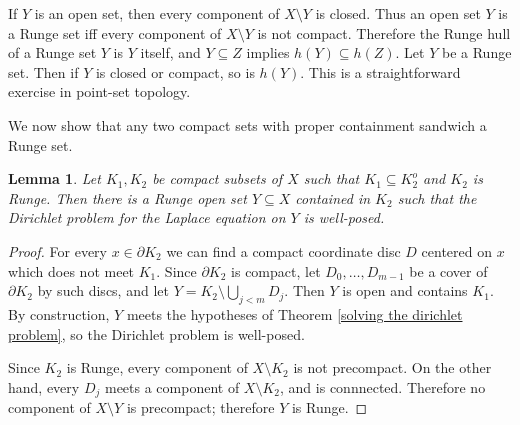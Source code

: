 \documentclass[reqno,12pt,letterpaper]{amsart}
\newcommand{\dfn}[1]{\emph{#1}\index{#1}}
\newtheorem{lemma}[theorem]{Lemma}
\theoremstyle{definition}
\newtheorem{definition}[theorem]{Definition}
\begin{document}
If $Y$ is an open set, then every component of $X \setminus Y$ is closed.
Thus an open set $Y$ is a Runge set iff every component of $X \setminus Y$ is not compact.
Therefore the Runge hull of a Runge set $Y$ is $Y$ itself, and $Y \subseteq Z$ implies $h(Y) \subseteq h(Z)$.
Let $Y$ be a Runge set. Then if $Y$ is closed or compact, so is $h(Y)$.
This is a straightforward exercise in point-set topology.




We now show that any two compact sets with proper containment sandwich a Runge set.

\begin{lemma}
\label{Runge sandwich}
Let $K_1, K_2$ be compact subsets of $X$ such that $K_1 \subseteq K_2^o$ and $K_2$ is Runge.
Then there is a Runge open set $Y \subseteq X$ contained in $K_2$ such that the Dirichlet problem for the Laplace equation on $Y$ is well-posed.
\end{lemma}
\begin{proof}
For every $x \in \partial K_2$ we can find a compact coordinate disc $D$ centered on $x$ which does not meet $K_1$.
Since $\partial K_2$ is compact, let $D_0, \dots, D_{m-1}$ be a cover of $\partial K_2$ by such discs, and let $Y = K_2 \setminus \bigcup_{j < m} D_j$.
Then $Y$ is open and contains $K_1$. By construction, $Y$ meets the hypotheses of Theorem \ref{solving the dirichlet problem}, so the Dirichlet problem is well-posed.

Since $K_2$ is Runge, every component of $X \setminus K_2$ is not precompact.
On the other hand, every $D_j$ meets a component of $X \setminus K_2$, and is connnected.
Therefore no component of $X \setminus Y$ is precompact; therefore $Y$ is Runge.
\end{proof}
\end{document}
